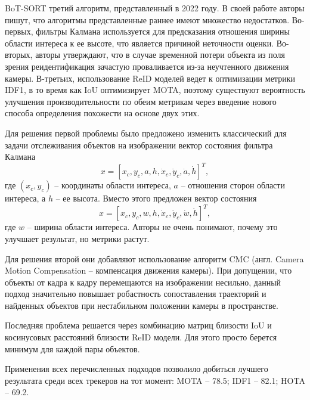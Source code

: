 BoT-SORT \cite{aharon2022bot} третий алгоритм, представленный в 2022 году. 
В своей работе авторы пишут, что алгоритмы представленные раннее имеют множество недостатков.
Во-первых, фильтры Калмана используется для предсказания отношения ширины области интереса к ее высоте, что является причиной неточности оценки. 
Во-вторых, авторы утверждают, что в случае временной потери объекта из поля зрения реидентификация зачастую проваливается из-за неучтенного движения камеры. 
В-третьих, использование ReID моделей ведет к оптимизации метрики IDF1, в то время как IoU оптимизирует MOTA, поэтому существуют вероятность улучшения производительности по обеим метрикам через введение нового способа определения похожести на основе двух этих. 

Для решения первой проблемы было предложено изменить классический для задачи отслеживания объектов на изображении вектор состояния фильтра Калмана 
\begin{equation}
    \label{eq:bot_old_kalman}
    x = [x_c, y_c, a, h, \dot x_c, \dot y_c, \dot a, \dot h]^T,
\end{equation}
где \((x_c, y_c)\) -- координаты области интереса, \(a\) -- отношения сторон области интереса, а \(h\) -- ее высота.
Вместо этого предложен вектор состояния
\begin{equation}
    \label{eq:bot_new_kalman}
    x = [x_c, y_c, w, h, \dot x_c, \dot y_c, \dot w, \dot h]^T,
\end{equation}
где \(w\) -- ширина области интереса. Авторы не очень понимают, почему это улучшает результат, но метрики растут. 

Для решения второй они добавляют использование алгоритм CMC (англ. Camera Motion Compensation -- компенсация движения камеры). При допущении, что объекты от кадра к кадру перемещаются на изображении несильно, данный подход значительно повышает робастность сопоставления траекторий и найденных объектов при нестабильном положении камеры в пространстве. 

Последняя проблема решается через комбинацию матриц близости IoU и косинусовых расстояний близости ReID модели. Для этого просто берется минимум для каждой пары объектов. 

Применения всех перечисленных подходов позволило добиться лучшего результата среди всех трекеров на тот момент: MOTA -- 78.5; IDF1 -- 82.1; HOTA -- 69.2.